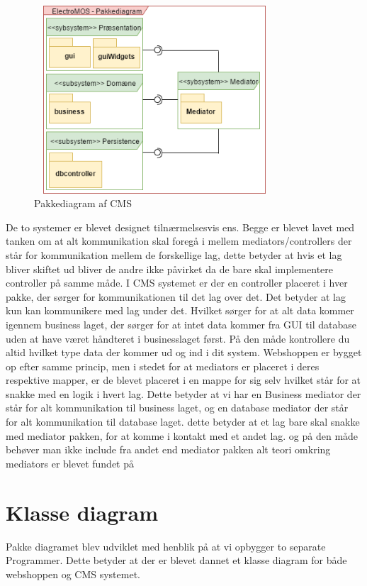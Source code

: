 \begin{figure}[H]
  \includegraphics[width=9cm, height=7cm]{elaborationsdokumentet/figurer/analyse/Pakkedia-CMS.png}
  \caption{Pakkediagram af CMS}
  \label{Pakkediagram-CMS}
\end{figure}
\onecolumn



De to systemer er blevet designet tilnærmelsesvis ens. Begge er blevet lavet med tanken om at alt kommunikation skal foregå i mellem mediators/controllers der står for kommunikation mellem de forskellige lag, dette betyder at hvis et lag bliver skiftet ud bliver de andre ikke påvirket da de bare skal implementere controller på samme måde.
I CMS systemet er der en controller placeret i hver pakke, der sørger for kommunikationen til det lag over det. Det betyder at lag kun kan kommunikere med lag under det. Hvilket sørger for at alt data kommer igennem business laget, der sørger for at intet data kommer fra GUI til database uden at have været håndteret i businesslaget først. På den måde kontrollere du altid hvilket type data der kommer ud og ind i dit system.
Webshoppen er bygget op efter samme princip, men i stedet for at mediators er placeret i deres respektive mapper, er de blevet placeret i en mappe for sig selv hvilket står for at snakke med en logik i hvert lag. Dette betyder at vi har en Business mediator der står for alt kommunikation til business laget, og en database mediator der står for alt kommunikation til database laget. dette betyder at et lag bare skal snakke med mediator pakken, for at komme i kontakt med et andet lag. og på den måde behøver man ikke include fra andet end mediator pakken
alt teori omkring mediators er blevet fundet på ~\cite{mediator} 



\section{Klasse diagram}
Pakke diagramet blev udviklet med henblik på at vi opbygger to separate Programmer. Dette betyder at der er blevet dannet et klasse diagram for både webshoppen og CMS systemet. 

